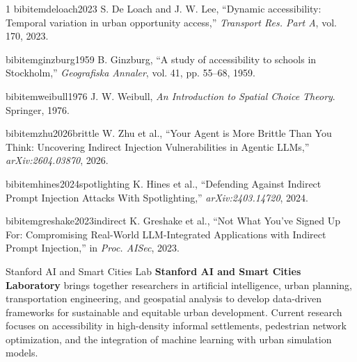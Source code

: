 \documentclass[journal]{IEEEtran}
\begin{document}
\begin{thebibliography}{1}
 bibitem{deloach2023}
 S. De Loach and J. W. Lee, ``Dynamic accessibility: Temporal variation in urban opportunity access,'' \emph{Transport Res. Part A}, vol. 170, 2023.

 bibitem{ginzburg1959}
 B. Ginzburg, ``A study of accessibility to schools in Stockholm,'' \emph{Geografiska Annaler}, vol. 41, pp. 55--68, 1959.

 bibitem{weibull1976}
 J. W. Weibull, \emph{An Introduction to Spatial Choice Theory}. Springer, 1976.

 bibitem{zhu2026brittle}
 W. Zhu et al., ``Your Agent is More Brittle Than You Think: Uncovering Indirect Injection Vulnerabilities in Agentic LLMs,'' \emph{arXiv:2604.03870}, 2026.

 bibitem{hines2024spotlighting}
 K. Hines et al., ``Defending Against Indirect Prompt Injection Attacks With Spotlighting,'' \emph{arXiv:2403.14720}, 2024.

 bibitem{greshake2023indirect}
 K. Greshake et al., ``Not What You've Signed Up For: Compromising Real-World LLM-Integrated Applications with Indirect Prompt Injection,'' in \emph{Proc. AISec}, 2023.

\end{thebibliography}

\begin{IEEEbiography}{Stanford AI and Smart Cities Lab}
\noindent\textbf{Stanford AI and Smart Cities Laboratory} brings together researchers in artificial intelligence, urban planning, transportation engineering, and geospatial analysis to develop data-driven frameworks for sustainable and equitable urban development. Current research focuses on accessibility in high-density informal settlements, pedestrian network optimization, and the integration of machine learning with urban simulation models.
\end{IEEEbiography}
\end{document}
